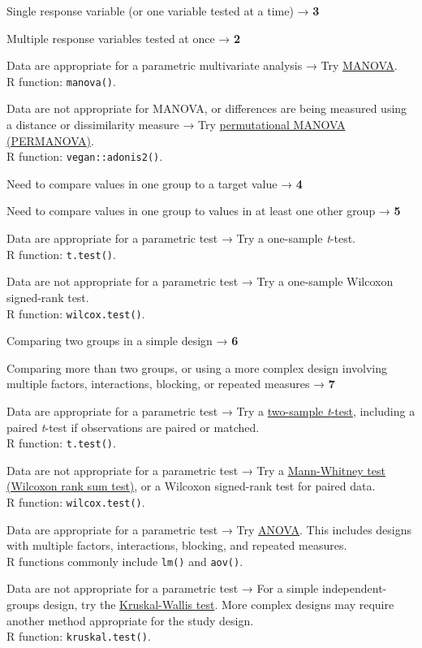 \documentclass[
  13,
  letterpaper,
]{report}
\providecommand{\tightlist}{%
  \setlength{\itemsep}{0pt}\setlength{\parskip}{0pt}}
\begin{document}
\begin{description}
\tightlist
\item[\textbf{1.}]
Single response variable (or one variable tested at a time) → \textbf{3}
\item[\textbf{1′.}]
Multiple response variables tested at once → \textbf{2}
\item[\textbf{2.}]
Data are appropriate for a parametric multivariate analysis → Try
\href{@sec-mtest-group-man}{MANOVA}.\\
R function: \texttt{manova()}.
\item[\textbf{2′.}]
Data are not appropriate for MANOVA, or differences are being measured
using a distance or dissimilarity measure → Try
\href{@sec-mtest-group-perm}{permutational MANOVA (PERMANOVA)}.\\
R function: \texttt{vegan::adonis2()}.
\item[\textbf{3.}]
Need to compare values in one group to a target value → \textbf{4}
\item[\textbf{3′.}]
Need to compare values in one group to values in at least one other
group → \textbf{5}
\item[\textbf{4.}]
Data are appropriate for a parametric test → Try a one-sample
\emph{t}-test.\\
R function: \texttt{t.test()}.
\item[\textbf{4′.}]
Data are not appropriate for a parametric test → Try a one-sample
Wilcoxon signed-rank test.\\
R function: \texttt{wilcox.test()}.
\item[\textbf{5.}]
Comparing two groups in a simple design → \textbf{6}
\item[\textbf{5′.}]
Comparing more than two groups, or using a more complex design involving
multiple factors, interactions, blocking, or repeated measures →
\textbf{7}
\item[\textbf{6.}]
Data are appropriate for a parametric test → Try a
\href{@sec-groups-2samp-2t}{two-sample \emph{t}-test}, including a
paired \emph{t}-test if observations are paired or matched.\\
R function: \texttt{t.test()}.
\item[\textbf{6′.}]
Data are not appropriate for a parametric test → Try a
\href{@sec-groups-2samp-wilcoxon}{Mann-Whitney test (Wilcoxon rank sum
test)}, or a Wilcoxon signed-rank test for paired data.\\
R function: \texttt{wilcox.test()}.
\item[\textbf{7.}]
Data are appropriate for a parametric test → Try
\href{@sec-groups-more-anova}{ANOVA}. This includes designs with
multiple factors, interactions, blocking, and repeated measures.\\
R functions commonly include \texttt{lm()} and \texttt{aov()}.
\item[\textbf{7′.}]
Data are not appropriate for a parametric test → For a simple
independent-groups design, try the
\href{@sec-groups-more-kw}{Kruskal-Wallis test}. More complex designs
may require another method appropriate for the study design.\\
R function: \texttt{kruskal.test()}.
\end{description}
\end{document}
